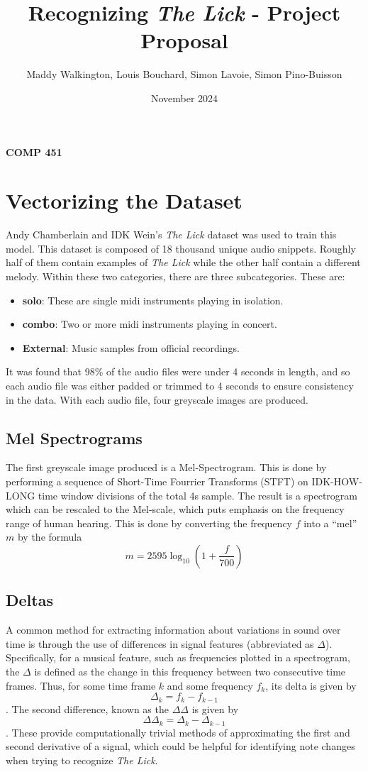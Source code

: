 \documentclass[12pt]{article}
\title{Recognizing \textit{The Lick} - Project Proposal}
\author{Maddy Walkington, Louis Bouchard, Simon Lavoie, Simon Pino-Buisson}
\date{November 2024}
\begin{document}
\maketitle

\begin{center}
    \textbf{COMP 451}
\end{center}
\section*{Vectorizing the Dataset}
Andy Chamberlain and IDK Wein’s \textit{The Lick} dataset was used to train this model. This dataset is composed of 18 thousand unique audio snippets. Roughly half of them contain examples of \textit{The Lick} while the other half contain a different melody. Within these two categories, there are three subcategories. These are:

\begin{itemize}
    \item \textbf{solo}: These are single midi instruments playing in isolation. 
    \item \textbf{combo}: Two or more midi instruments playing in concert. 
    \item \textbf{External}: Music samples from official recordings. 
\end{itemize}
It was found that 98\% of the audio files were under 4 seconds in length, and so each audio file was either padded or trimmed to 4 seconds to ensure consistency in the data. With each audio file, four greyscale images are produced. 

\subsection*{Mel Spectrograms}
The first greyscale image produced is a Mel-Spectrogram. This is done by performing a sequence of Short-Time Fourrier Transforms (STFT) on IDK-HOW-LONG time window divisions of the total 4s sample.
The result is a spectrogram which can be rescaled to the Mel-scale, which puts emphasis on the frequency range of human hearing.
This is done by converting the frequency $f$ into a “mel” $m$ by the formula 
\[ m = 2595\log_{10}\left(1 + \frac{f}{700}\right)\]\cite{SOMETHING}

\subsection{Deltas}
A common method for extracting information about variations in sound over time is through the use of differences in signal features (abbreviated as $\Delta$). Specifically, for a musical feature, such as frequencies plotted in a spectrogram, the $\Delta$ is defined as the change in this frequency between two consecutive time frames. Thus, for some time frame $k$ and some frequency $f_k$, its delta is given by
$$\Delta_k = f_k - f_{k-1}$$.
The second difference, known as the $\Delta\Delta$ is given by
$$ \Delta\Delta_k = \Delta_k - \Delta_{k-1}$$. 
These provide computationally trivial methods of approximating the first and second derivative of a signal, which could be helpful for identifying note changes when trying to recognize \textit{The Lick}.



\end{document}
